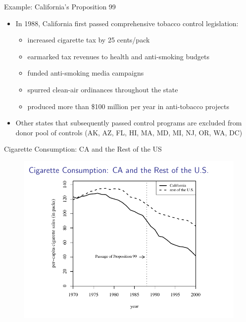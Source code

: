 \documentclass{beamer}
\begin{document}
\begin{frame}{Example: California's Proposition 99}
	
	\begin{itemize}
	\item In 1988, California first passed comprehensive tobacco control legislation:
		\begin{itemize}
		\item increased cigarette tax by 25 cents/pack
		\item earmarked tax revenues to health and anti-smoking budgets
		\item funded anti-smoking media campaigns
		\item spurred clean-air ordinances throughout the state
		\item produced more than \$100 million per year in anti-tobacco projects
		\end{itemize}
	\item Other states that subsequently passed control programs are excluded from donor pool of controls (AK, AZ, FL, HI, MA, MD, MI, NJ, OR, WA, DC)
	\end{itemize}
\end{frame}

\begin{frame}{Cigarette Consumption: CA and the Rest of the US}
	
	\begin{figure}
	\includegraphics[scale=0.75]{./lecture_includes/abadie_3.pdf}
	\end{figure}
\end{frame}
\end{document}
